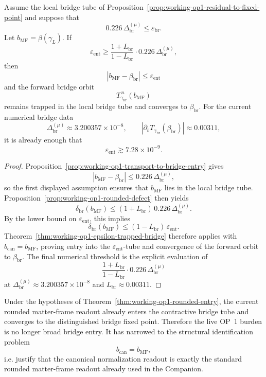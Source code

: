 \begin{theorem}
\label{thm:working-op1-rounded-entry}
Assume the local bridge tube of Proposition~\ref{prop:working-op1-residual-to-fixed-point} and suppose that
\[
 0.226\,\Delta^{(\mu)}_{\mathrm{br}}
 \le
 \varepsilon_{\mathrm{br}}.
\]
Let \(b_{\mathrm{MF}}=\beta(\gamma_L)\). If
\[
 \varepsilon_{\mathrm{ent}}
 \ge
 \frac{1+L_{\mathrm{br}}}{1-L_{\mathrm{br}}}
 \cdot 0.226\,\Delta^{(\mu)}_{\mathrm{br}},
\]
then
\[
 |b_{\mathrm{MF}}-\beta_{\mathrm{br}}|
 \le
 \varepsilon_{\mathrm{ent}}
\]
and the forward bridge orbit
\[
 T_{\gamma_{\mathrm{br}}}^{\,n}(b_{\mathrm{MF}})
\]
remains trapped in the local bridge tube and converges to \(\beta_{\mathrm{br}}\).
For the current numerical bridge data
\[
 \Delta^{(\mu)}_{\mathrm{br}}\approx 3.200357\times10^{-8},
 \qquad
 |\partial_b T_{\gamma_{\mathrm{br}}}(\beta_{\mathrm{br}})|\approx 0.00311,
\]
it is already enough that
\[
 \varepsilon_{\mathrm{ent}}\gtrsim 7.28\times10^{-9}.
\]
\end{theorem}

\begin{proof}
Proposition~\ref{prop:working-op1-transport-to-bridge-entry} gives
\[
 |b_{\mathrm{MF}}-\beta_{\mathrm{br}}|
 \le
 0.226\,\Delta^{(\mu)}_{\mathrm{br}},
\]
so the first displayed assumption ensures that \(b_{\mathrm{MF}}\) lies in the local bridge tube. Proposition~\ref{prop:working-op1-rounded-defect} then yields
\[
 \delta_{\mathrm{br}}(b_{\mathrm{MF}})
 \le
 (1+L_{\mathrm{br}})\,0.226\,\Delta^{(\mu)}_{\mathrm{br}}.
\]
By the lower bound on \(\varepsilon_{\mathrm{ent}}\), this implies
\[
 \delta_{\mathrm{br}}(b_{\mathrm{MF}})
 \le
 (1-L_{\mathrm{br}})\,\varepsilon_{\mathrm{ent}}.
\]
Theorem~\ref{thm:working-op1-epsilon-trapped-bridge} therefore applies with \(b_{\mathrm{can}}=b_{\mathrm{MF}}\), proving entry into the \(\varepsilon_{\mathrm{ent}}\)-tube and convergence of the forward orbit to \(\beta_{\mathrm{br}}\). The final numerical threshold is the explicit evaluation of
\[
 \frac{1+L_{\mathrm{br}}}{1-L_{\mathrm{br}}}
 \cdot 0.226\,\Delta^{(\mu)}_{\mathrm{br}}
\]
at \(\Delta^{(\mu)}_{\mathrm{br}}\approx 3.200357\times10^{-8}\) and \(L_{\mathrm{br}}\approx 0.00311\).
\end{proof}

\begin{corollary}
\label{cor:working-op1-narrowed-live-burden}
Under the hypotheses of Theorem~\ref{thm:working-op1-rounded-entry}, the current rounded matter-frame readout already enters the contractive bridge tube and converges to the distinguished bridge fixed point. Therefore the live OP~1 burden is no longer broad bridge entry. It has narrowed to the structural identification problem
\[
 b_{\mathrm{can}}=b_{\mathrm{MF}},
\]
i.e. justify that the canonical normalization readout is exactly the standard rounded matter-frame readout already used in the Companion.
\end{corollary}

